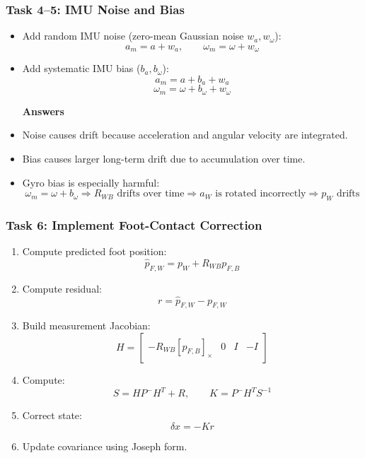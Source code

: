 \documentclass[aspectratio=169]{beamer}
\begin{document}
\begin{frame}
	\frametitle{Task 4--5: IMU Noise and Bias}
	
	\begin{itemize}
		\item Add random IMU noise (zero-mean Gaussian noise $w_a, w_\omega$):
		\[
		a_m = a + w_a,
		\qquad
		\omega_m = \omega + w_\omega
		\]
		
		\item Add systematic IMU bias ($b_a, b_\omega$):
		\[
		a_m = a + b_a + w_a
		\]
		\[
		\omega_m = \omega + b_\omega + w_\omega
		\]
		
		\pause
		\textbf{Answers}
		\item Noise causes drift because acceleration and angular velocity are integrated.
		\item Bias causes larger long-term drift due to accumulation over time.
		
		\item Gyro bias is especially harmful:
		\[
		\omega_m = \omega + b_\omega
		\Rightarrow
		R_{WB} \text{ drifts over time}
		\Rightarrow
		a_W \text{ is rotated incorrectly}
		\Rightarrow
		p_W \text{ drifts}
		\]
	\end{itemize}
	
\end{frame}


\begin{frame}
	\frametitle{Task 6: Implement Foot-Contact Correction}
	
	\begin{enumerate}
		\item Compute predicted foot position:
		\[
		\hat{p}_{F,W} = p_W + R_{WB}p_{F,B}
		\]
		
		\item Compute residual:
		\[
		r = \hat{p}_{F,W} - p_{F,W}
		\]
		
		\item Build measurement Jacobian:
		\[
		H =
		\begin{bmatrix}
			-R_{WB}[p_{F,B}]_\times
			&
			0
			&
			I
			&
			-I
		\end{bmatrix}
		\]
		
		\item Compute:
		\[
		S = HP^-H^T + R,
		\qquad
		K = P^-H^TS^{-1}
		\]
		
		\item Correct state:
		\[
		\delta x = -Kr
		\]
		
		\item Update covariance using Joseph form.
	\end{enumerate}
	
\end{frame}
\end{document}
